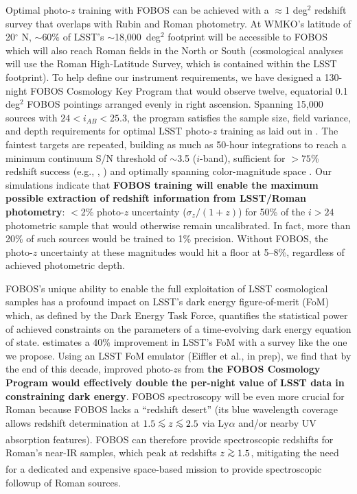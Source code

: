 \documentclass[oneside,11pt]{amsart}
\DeclareRobustCommand{\gtrsim}{%
\mathrel{\hskip-.5em\begin{array}{c}>\\[-8pt]\sim\end{array}\hskip-.5em}}
\DeclareRobustCommand{\lesssim}{%
\mathrel{\hskip-.5em\begin{array}{c}<\\[-8pt]\sim\end{array}\hskip-.5em}}
\begin{document}
Optimal photo-$z$ training with FOBOS can be achieved with a $\approx$1 deg$^2$ redshift survey that overlaps with Rubin and Roman photometry.  At WMKO's latitude of 20$^\circ$ N, $\sim$60\% of LSST's $\sim$18,000~deg$^{2}$ footprint will be accessible to FOBOS which will also reach Roman fields in the North or South (cosmological analyses will use the Roman High-Latitude Survey, which is contained within the LSST footprint).  To help define our instrument requirements, we have designed a 130-night FOBOS Cosmology Key Program that would observe twelve, equatorial 0.1 deg$^2$ FOBOS pointings arranged evenly in right ascension.  Spanning 15,000 sources with $24 < i_{AB} < 25.3$, the program satisfies the sample size, field variance, and depth requirements for optimal LSST photo-$z$ training as laid out in \citet{newman15}.  The faintest targets are repeated, building as much as 50-hour integrations to reach a minimum continuum S/N threshold of $\sim$3.5 ($i$-band), sufficient for $>75$\% redshift success (e.g., \citealp{Newman13}, \citealp{masters19}) and optimally spanning color-magnitude space \citep{masters15, masters19}.  Our simulations indicate that \textbf{FOBOS training will enable the maximum possible extraction of redshift information from LSST/Roman photometry}: $<$2\% photo-$z$ uncertainty ($\sigma_z / (1+z)$) for 50\% of the $i > 24$ photometric sample that would otherwise remain uncalibrated.  In fact, more than 20\% of such sources would be trained to 1\% precision.  Without FOBOS, the photo-$z$ uncertainty at these magnitudes would hit a floor at 5--8\%, regardless of achieved photometric depth.





FOBOS's unique ability to enable the full exploitation of LSST cosmological samples has a profound impact on LSST's dark energy figure-of-merit (FoM) which, as defined by the Dark Energy Task Force, quantifies the statistical power of achieved constraints on the parameters of a time-evolving dark energy equation of state.  \citet{newman15} estimates a 40\% improvement in LSST's FoM with a survey like the one we propose.  Using an LSST FoM emulator (Eiffler et al., in prep), we find that by the end of this decade, improved photo-$z$s from \textbf{the FOBOS Cosmology Program would effectively double the per-night value of LSST data in constraining dark energy}.  FOBOS spectroscopy will be even more crucial for Roman because FOBOS lacks a ``redshift desert'' (its blue wavelength coverage allows redshift determination at $1.5\lesssim z \lesssim2.5$ via Ly$\alpha$ and/or nearby UV absorption features).  FOBOS can therefore provide spectroscopic redshifts for Roman's near-IR samples, which peak at redshifts $z \gtrsim 1.5$, mitigating the need for a dedicated and expensive space-based mission to provide spectroscopic followup of Roman sources.
\end{document}

